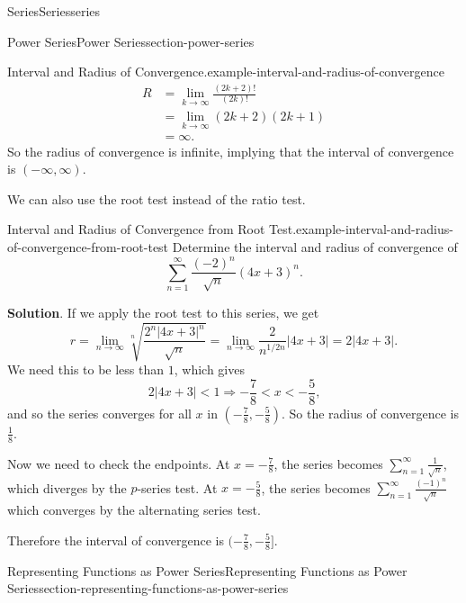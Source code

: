 \documentclass[oneside,10pt,]{book}
\numberwithin{equation}{section}
\newcommand{\lt}{<}
\newcommand{\amp}{&}
\begin{document}
\begin{chapterptx}{Series}{}{Series}{}{}{series}
\begin{sectionptx}{Power Series}{}{Power Series}{}{}{section-power-series}
\begin{example}{Interval and Radius of Convergence.}{example-interval-and-radius-of-convergence}
\begin{align*}
R \amp = \lim_{k\to\infty}\frac{(2k + 2)!}{(2k)!} \\
\amp = \lim_{k\to\infty} (2k + 2)(2k + 1) \\
\amp = \infty \text{.}
\end{align*}
So the radius of convergence is infinite, implying that the interval of convergence is \((-\infty,\infty)\).%
\end{example}
\hypertarget{p-943}{}%
We can also use the root test instead of the ratio test.%
\begin{example}{Interval and Radius of Convergence from Root Test.}{example-interval-and-radius-of-convergence-from-root-test}%
\hypertarget{p-944}{}%
Determine the interval and radius of convergence of%
\begin{equation*}
\sum_{n = 1}^{\infty} \frac{(-2)^{n}}{\sqrt{n}}(4x + 3)^{n}\text{.}
\end{equation*}
%
\par\smallskip%
\noindent\textbf{Solution}.\hypertarget{solution-192}{}\quad%
\hypertarget{p-945}{}%
If we apply the root test to this series, we get%
\begin{equation*}
r = \lim_{n\to\infty}\sqrt[n]{\frac{2^{n}|4x + 3|^{n}}{\sqrt{n}}} = \lim_{n\to\infty}\frac{2}{n^{1/2n}}|4x + 3| = 2|4x + 3|\text{.}
\end{equation*}
We need this to be less than \(1\), which gives%
\begin{equation*}
2|4x + 3| \lt 1 \Rightarrow -\frac{7}{8} \lt x \lt -\frac{5}{8}\text{,}
\end{equation*}
and so the series converges for all \(x\) in \((-\frac{7}{8}, -\frac{5}{8})\). So the radius of convergence is \(\frac{1}{8}\).%
\par
\hypertarget{p-946}{}%
Now we need to check the endpoints. At \(x = -\frac{7}{8}\), the series becomes \(\sum_{n = 1}^{\infty}\frac{1}{\sqrt{n}}\), which diverges by the \(p\)-series test. At \(x = -\frac{5}{8}\), the series becomes \(\sum_{n=1}^{\infty}\frac{(-1)^{n}}{\sqrt{n}}\) which converges by the alternating series test.%
\par
\hypertarget{p-947}{}%
Therefore the interval of convergence is \((-\frac{7}{8}, -\frac{5}{8}]\).%
\end{example}
\end{sectionptx}
%
%
\typeout{************************************************}
\typeout{************************************************}
%
\begin{sectionptx}{Representing Functions as Power Series}{}{Representing Functions as Power Series}{}{}{section-representing-functions-as-power-series}

\end{sectionptx}
\end{chapterptx}
\end{document}
